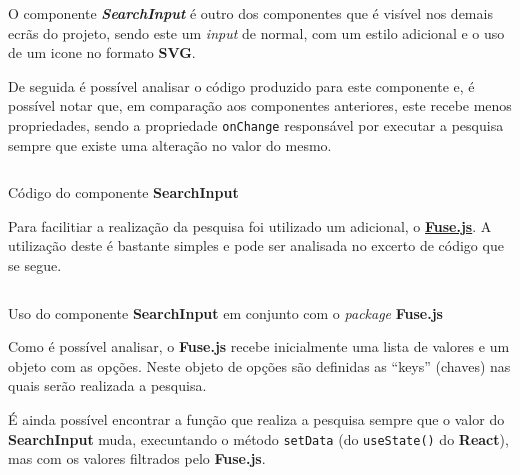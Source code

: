 

O componente \textbf{\textit{SearchInput}} é outro dos componentes que é visível nos demais ecrãs do projeto, sendo este um \textit{input} de \textbf{} normal, com um estilo adicional e o uso de um icone no formato \textbf{SVG}.

De seguida é possível analisar o código produzido para este componente e, é possível notar que, em comparação aos componentes anteriores, este recebe menos propriedades, sendo a propriedade \texttt{onChange} responsável por executar a pesquisa sempre que existe uma alteração no valor do mesmo.

\begin{longlisting}
	\inputminted[]{jsx}{code/components/search-input.tsx}

	\caption{Código do componente \textbf{SearchInput}}
\end{longlisting}

Para facilitiar a realização da pesquisa foi utilizado um \textit{} adicional, o \textbf{\href{https://fusejs.io/}{Fuse.js}}. A utilização deste \textit{} é bastante simples e pode ser analisada no excerto de código que se segue.

\begin{longlisting}
	\inputminted[]{jsx}{code/components/use-search-input.tsx}

	\caption{Uso do componente \textbf{SearchInput} em conjunto com o \textit{package} \textbf{Fuse.js}}
\end{longlisting}

Como é possível analisar, o \textit{} \textbf{Fuse.js} recebe inicialmente uma lista de valores e um objeto com as opções. Neste objeto de opções são definidas as ``keys'' (chaves) nas quais serão realizada a pesquisa.

É ainda possível encontrar a função que realiza a pesquisa sempre que o valor do \textbf{SearchInput} muda, execuntando o método \texttt{setData} (do \texttt{useState()} do \textbf{React}), mas com os valores filtrados pelo \textbf{Fuse.js}.